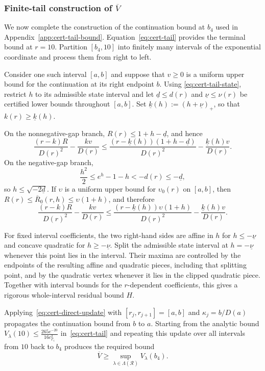 \documentclass[11pt]{article}
\theoremstyle{definition}
\theoremstyle{remark}
\begin{document}
\subsubsection{Finite-tail construction of \texorpdfstring{$\overline V$}{V}}

We now complete the construction of the continuation bound at $b_4$
used in Appendix~\ref{app:cert-tail-bound}.  Equation~\eqref{eq:cert-tail}
provides the terminal bound at $r=10$.  Partition $[b_4,10]$ into
finitely many intervals of the exponential coordinate and process them from right to left.

Consider one such interval $[a,b]$ and suppose that $v\ge0$ is a uniform
upper bound for the continuation at its right endpoint $b$.  Using
\eqref{eq:cert-tail-state}, restrict $h$ to its admissible state interval
and let $\underline d\le d(r)$ and $\underline \nu\le \nu(r)$ be certified
lower bounds throughout $[a,b]$.  Set
$\underline k(h):=(h+\underline \nu)_+$, so that $k(r)\ge \underline k(h)$.

On the nonnegative-gap branch, $R(r)\le1+h-\underline d$, and hence
\begin{equation}\label{eq:cert-tail-positive-residual}
 \frac{(r-k)R}{D(r)^2}-\frac{kv}{D(r)}
 \le
 \frac{(r-\underline k(h))(1+h-\underline d)}{D(r)^2}
 -\frac{\underline k(h)v}{D(r)}.
\end{equation}
On the negative-gap branch,
\[
 \frac{h^2}{2}\le e^h-1-h<-d(r)\le-\underline d,
\]
so $h\le\sqrt{-2\underline d}$.  If $\upsilon$ is a uniform upper bound
for $\upsilon_0(r)$ on $[a,b]$, then
$R(r)\le\overline R_0(r,h)\le\upsilon(1+h)$, and therefore
\begin{equation}\label{eq:cert-tail-negative-residual}
 \frac{(r-k)R}{D(r)^2}-\frac{kv}{D(r)}
 \le
 \frac{(r-\underline k(h))\upsilon(1+h)}{D(r)^2}
 -\frac{\underline k(h)v}{D(r)}.
\end{equation}

For fixed interval coefficients, the two right-hand sides are affine in
$h$ for $h\le-\underline \nu$ and concave quadratic for
$h\ge-\underline \nu$.  Split the admissible state interval at
$h=-\underline \nu$ whenever this point lies in the interval.
Their maxima are controlled by the endpoints of the resulting affine and
quadratic pieces, including that splitting point, and by the quadratic
vertex whenever it lies in the clipped quadratic piece.  Together with interval bounds for the
$r$-dependent coefficients, this gives a rigorous whole-interval
residual bound $H$.

Applying~\eqref{eq:cert-direct-update} with
$[r_j,r_{j+1}]=[a,b]$ and $\kappa_j=b/D(a)$ propagates the continuation bound from $b$ to $a$.
Starting from the analytic bound
$
 V_\lambda(10)\le\frac{265e^{-20}}{16c_{\Gamma_1}^2}$
in~\eqref{eq:cert-tail} and repeating this update over all intervals from $10$ back to $b_4$
produces the required bound
\[
 \overline V\ge
 \sup_{\lambda\in\Lambda(\mathcal R)}V_\lambda(b_4).
\]
\end{document}

